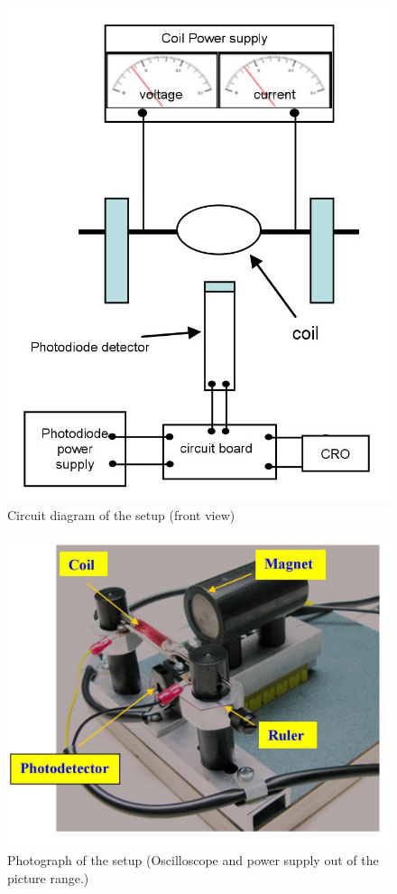 \documentclass[12pt]{report}
\begin{document}
\begin{figure}[h]
\centering
\includegraphics[scale=1.1]{lab3-sessionb-diagram}
\caption{Circuit diagram of the setup (front view)}
\label{Fig:lab3-sessionb-diagram}
\end{figure}

\begin{figure}[h]
\centering
\includegraphics[scale=0.9]{lab3-sessionb-setup}
\caption{Photograph of the setup (Oscilloscope and power supply out of the picture range.)}
\label{Fig:lab3-sessionb-setup}
\end{figure}
\end{document}
